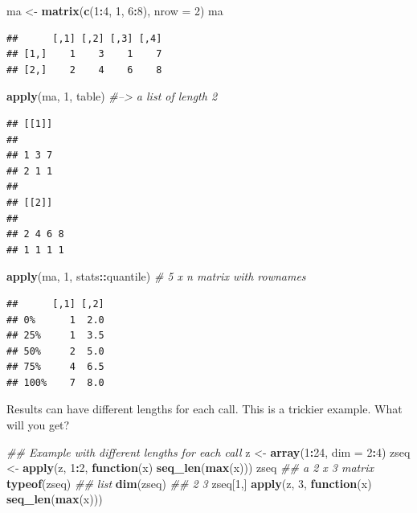 \documentclass[12pt,]{krantz}
\makeatletter
\newenvironment{Shaded}{\begin{snugshade}}{\end{snugshade}}
\newcommand{\CommentTok}[1]{\textcolor[rgb]{0.37,0.37,0.37}{\textit{#1}}}
\newcommand{\ControlFlowTok}[1]{\textcolor[rgb]{0.27,0.27,0.27}{\textbf{#1}}}
\newcommand{\DataTypeTok}[1]{\textcolor[rgb]{0.27,0.27,0.27}{#1}}
\newcommand{\DecValTok}[1]{\textcolor[rgb]{0.06,0.06,0.06}{#1}}
\newcommand{\KeywordTok}[1]{\textcolor[rgb]{0.27,0.27,0.27}{\textbf{#1}}}
\newcommand{\NormalTok}[1]{#1}
\newcommand{\OperatorTok}[1]{\textcolor[rgb]{0.43,0.43,0.43}{\textbf{#1}}}
\newcommand{\StringTok}[1]{\textcolor[rgb]{0.5,0.5,0.5}{#1}}
\newenvironment{kframe}{%
\medskip{}
\setlength{\fboxsep}{.8em}
 \def\at@end@of@kframe{}%
 \ifinner\ifhmode%
  \def\at@end@of@kframe{\end{minipage}}%
  \begin{minipage}{\columnwidth}%
 \fi\fi%
 \def\FrameCommand##1{\hskip\@totalleftmargin \hskip-\fboxsep
 \colorbox{shadecolor}{##1}\hskip-\fboxsep
     \hskip-\linewidth \hskip-\@totalleftmargin \hskip\columnwidth}%
 \MakeFramed {\advance\hsize-\width
   \@totalleftmargin\z@ \linewidth\hsize
   \@setminipage}}%
 {\par\unskip\endMakeFramed%
 \at@end@of@kframe}
\renewenvironment{Shaded}{\begin{kframe}}{\end{kframe}}
\makeatother
\begin{document}
\begin{Shaded}
\begin{Highlighting}[]
\NormalTok{ma <-}\StringTok{ }\KeywordTok{matrix}\NormalTok{(}\KeywordTok{c}\NormalTok{(}\DecValTok{1}\OperatorTok{:}\DecValTok{4}\NormalTok{, }\DecValTok{1}\NormalTok{, }\DecValTok{6}\OperatorTok{:}\DecValTok{8}\NormalTok{), }\DataTypeTok{nrow =} \DecValTok{2}\NormalTok{)}
\NormalTok{ma}
\end{Highlighting}
\end{Shaded}

\begin{verbatim}
##      [,1] [,2] [,3] [,4]
## [1,]    1    3    1    7
## [2,]    2    4    6    8
\end{verbatim}

\begin{Shaded}
\begin{Highlighting}[]
\KeywordTok{apply}\NormalTok{(ma, }\DecValTok{1}\NormalTok{, table)  }\CommentTok{#--> a list of length 2}
\end{Highlighting}
\end{Shaded}

\begin{verbatim}
## [[1]]
## 
## 1 3 7 
## 2 1 1 
## 
## [[2]]
## 
## 2 4 6 8 
## 1 1 1 1
\end{verbatim}

\begin{Shaded}
\begin{Highlighting}[]
\KeywordTok{apply}\NormalTok{(ma, }\DecValTok{1}\NormalTok{, stats}\OperatorTok{::}\NormalTok{quantile) }\CommentTok{# 5 x n matrix with rownames}
\end{Highlighting}
\end{Shaded}

\begin{verbatim}
##      [,1] [,2]
## 0%      1  2.0
## 25%     1  3.5
## 50%     2  5.0
## 75%     4  6.5
## 100%    7  8.0
\end{verbatim}

Results can have different lengths for each call. This is a trickier example. What will you get?

\begin{Shaded}
\begin{Highlighting}[]
\CommentTok{## Example with different lengths for each call}
\NormalTok{z <-}\StringTok{ }\KeywordTok{array}\NormalTok{(}\DecValTok{1}\OperatorTok{:}\DecValTok{24}\NormalTok{, }\DataTypeTok{dim =} \DecValTok{2}\OperatorTok{:}\DecValTok{4}\NormalTok{)}
\NormalTok{zseq <-}\StringTok{ }\KeywordTok{apply}\NormalTok{(z, }\DecValTok{1}\OperatorTok{:}\DecValTok{2}\NormalTok{, }\ControlFlowTok{function}\NormalTok{(x) }\KeywordTok{seq_len}\NormalTok{(}\KeywordTok{max}\NormalTok{(x)))}
\NormalTok{zseq         }\CommentTok{## a 2 x 3 matrix}
\KeywordTok{typeof}\NormalTok{(zseq) }\CommentTok{## list}
\KeywordTok{dim}\NormalTok{(zseq) }\CommentTok{## 2 3}
\NormalTok{zseq[}\DecValTok{1}\NormalTok{,]}
\KeywordTok{apply}\NormalTok{(z, }\DecValTok{3}\NormalTok{, }\ControlFlowTok{function}\NormalTok{(x) }\KeywordTok{seq_len}\NormalTok{(}\KeywordTok{max}\NormalTok{(x)))}
\end{Highlighting}
\end{Shaded}
\end{document}
